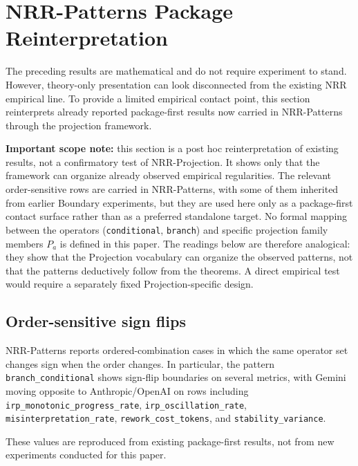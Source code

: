 \documentclass[11pt,a4paper]{article}
\begin{document}
\section{NRR-Patterns Package Reinterpretation}
\label{sec:boundary}

The preceding results are mathematical and do not require experiment to stand. However, theory-only presentation can look disconnected from the existing NRR empirical line. To provide a limited empirical contact point, this section reinterprets already reported package-first results now carried in NRR-Patterns \cite{saito2026patterns} through the projection framework.

\textbf{Important scope note:} this section is a post hoc reinterpretation of existing results, not a confirmatory test of NRR-Projection. It shows only that the framework can organize already observed empirical regularities. The relevant order-sensitive rows are carried in NRR-Patterns, with some of them inherited from earlier Boundary experiments, but they are used here only as a package-first contact surface rather than as a preferred standalone target. No formal mapping between the operators (\texttt{conditional}, \texttt{branch}) and specific projection family members $P_a$ is defined in this paper. The readings below are therefore analogical: they show that the Projection vocabulary can organize the observed patterns, not that the patterns deductively follow from the theorems. A direct empirical test would require a separately fixed Projection-specific design.

\subsection{Order-sensitive sign flips}

NRR-Patterns \cite{saito2026patterns} reports ordered-combination cases in which the same operator set changes sign when the order changes. In particular, the pattern \texttt{branch\_conditional} shows sign-flip boundaries on several metrics, with Gemini moving opposite to Anthropic/OpenAI on rows including \texttt{irp\_monotonic\_progress\_rate}, \texttt{irp\_oscillation\_rate}, \texttt{misinterpretation\_rate}, \texttt{rework\_cost\_tokens}, and \texttt{stability\_variance}.

These values are reproduced from existing package-first results, not from new experiments conducted for this paper.
\end{document}
